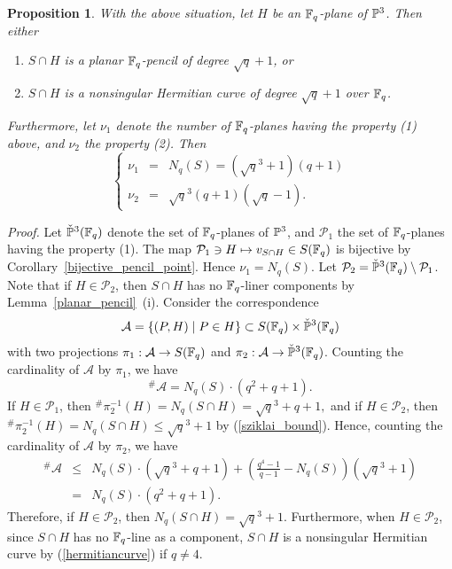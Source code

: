 \documentclass[a4paper,11pt]{article}
\newtheorem{proposition}[theorem]{Proposition}
\newcommand{\proof}{\noindent \mbox{\em Proof.\hspace*{2mm}}}
\begin{document}
\begin{proposition}\label{sqrt_q_plus_one_case}
With the above situation,
let $H$ be an ${\Bbb F}_q$-plane of ${\Bbb P}^3$.
Then either
\begin{enumerate}[{\rm (1)}]
\item $S \cap H$ is a planar ${\Bbb F}_q$-pencil of degree $\sqrt{q}+1$, or
\item $S \cap H$ is a nonsingular Hermitian curve
of degree $\sqrt{q}+1$ over ${\Bbb F}_q$.
\end{enumerate}
Furthermore, let $\nu_1$ denote the number of
${\Bbb F}_q$-planes having the property {\rm (1)} above,
and $\nu_2$ the property {\rm (2)}.
Then
\begin{equation*}
\left\{
\begin{array}{ccc}
 \nu_1 &=& N_q(S) = (\sqrt{q}^3 +1)(q+1) \\
 \nu_2 &=& \sqrt{q}^3 (q+1)(\sqrt{q} -1).
\end{array}
\right.
\end{equation*}
\end{proposition}
\proof
Let $\check{\Bbb P}^3({\Bbb F}_q)$ denote
the set of ${\Bbb F}_q$-planes of ${\Bbb P}^3$,
and $\mathcal{P}_1$ the set of ${\Bbb F}_q$-planes
having the property (1).
The map $\mathcal{P}_1 \ni H \mapsto v_{S \cap H} \in S({\Bbb F}_q)$
is bijective by Corollary~\ref{bijective_pencil_point}.
Hence $\nu_1 = N_q(S)$.
Let $\mathcal{P}_2= \check{\Bbb P}^3({\Bbb F}_q) \setminus \mathcal{P}_1 $.
Note that if $H \in \mathcal{P}_2$, then
$S \cap H$ has no ${\Bbb F}_q$-liner components by
Lemma~\ref{planar_pencil}~(i).
Consider the correspondence
\[
\mathcal{A} = \{(P, H) \mid P \in H\}
\subset S({\Bbb F}_q) \times \check{\Bbb P}^3({\Bbb F}_q)
\]
with two projections
$\pi_1: \mathcal{A} \to  S({\Bbb F}_q)$ and
$\pi_2: \mathcal{A} \to  \check{\Bbb P}^3({\Bbb F}_q)$.
Counting the cardinality of $\mathcal{A}$ by $\pi_1$, we have
\[
{}^{\#}\mathcal{A} = N_q(S)\cdot(q^2+q+1).
\]
If $H \in \mathcal{P}_1$,
then 
$
{}^{\#}\pi_2^{-1}(H) = N_q(S \cap H) = \sqrt{q}^3+q +1,
$
and if $H \in  \mathcal{P}_2$, then
$
{}^{\#}\pi_2^{-1}(H) = N_q(S \cap H) \leq \sqrt{q}^3 +1
$
by (\ref{sziklai_bound}).
Hence, counting the cardinality of $\mathcal{A}$ by $\pi_2$, we have
\begin{eqnarray*}
{}^{\#}\mathcal{A} &\leq & N_q(S)\cdot (\sqrt{q}^3+q +1)
    + \left(
     \frac{q^4 -1}{q-1} -N_q(S)
    \right) (\sqrt{q}^3 +1)\\
    &=& N_q(S)\cdot(q^2+q+1).
\end{eqnarray*}
Therefore, if $H \in \mathcal{P}_2$,
then $N_q(S \cap H) = \sqrt{q}^3 +1$.
Furthermore, when $H \in \mathcal{P}_2$,
since $S \cap H$ has no ${\Bbb F}_q$-line as a component,
$S\cap H$ is a nonsingular Hermitian curve
by (\ref{hermitiancurve}) if $q \neq 4$. 
\end{document}
